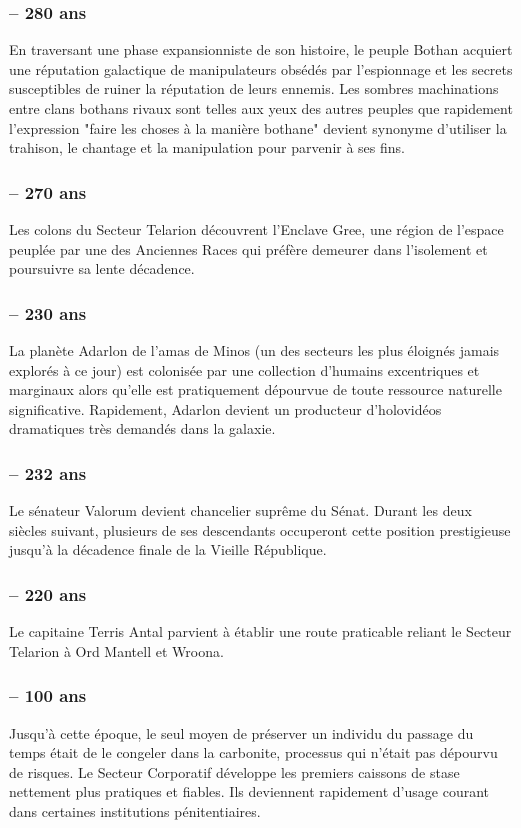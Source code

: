 \documentclass[twoside]{article}
\begin{document}
\subsubsection*{-- 280 ans} 
En traversant une phase expansionniste de son histoire, le peuple Bothan acquiert une réputation galactique de manipulateurs obsédés par l'espionnage et les secrets susceptibles de ruiner la réputation de leurs ennemis. Les sombres machinations entre clans bothans rivaux sont telles aux yeux des autres peuples que rapidement l'expression "faire les choses à la manière bothane" devient synonyme d'utiliser la trahison, le chantage et la manipulation pour parvenir à ses fins. 
\subsubsection*{-- 270 ans} 
Les colons du Secteur Telarion découvrent l'Enclave Gree, une région de l'espace peuplée par une des Anciennes Races qui préfère demeurer dans l'isolement et poursuivre sa lente décadence. 
\subsubsection*{-- 230 ans} 
La planète Adarlon de l'amas de Minos (un des secteurs les plus éloignés jamais explorés à ce jour) est colonisée par une collection d'humains excentriques et marginaux alors qu'elle est pratiquement dépourvue de toute ressource naturelle significative.  Rapidement, Adarlon devient un producteur d'holovidéos dramatiques très demandés dans la galaxie. 
\subsubsection*{-- 232 ans} 
Le sénateur Valorum devient chancelier suprême du Sénat. Durant les deux siècles suivant, plusieurs de ses descendants occuperont cette position prestigieuse jusqu'à la décadence finale de la Vieille République. 
\subsubsection*{-- 220 ans} 
Le capitaine Terris Antal parvient à établir une route praticable reliant le Secteur Telarion à Ord Mantell et Wroona.
\subsubsection*{-- 100 ans} 
Jusqu'à cette époque, le seul moyen de préserver un individu du passage du temps était de le congeler dans la carbonite, processus qui n'était pas dépourvu de risques. Le Secteur Corporatif développe les premiers caissons de stase nettement plus pratiques et fiables. Ils deviennent rapidement d'usage courant dans certaines institutions pénitentiaires.\\
  
\end{document}

